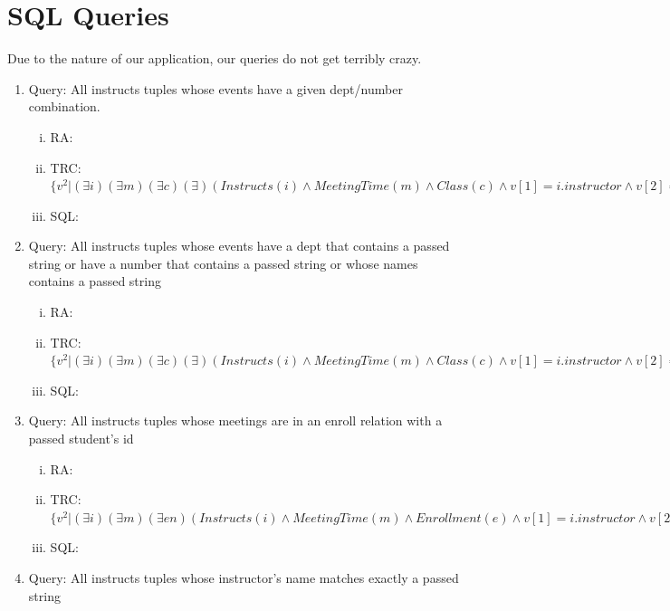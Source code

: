 \documentclass[pdftex,12pt,letter]{article}
\begin{document}
\section{SQL Queries}
Due to the nature of our application, our queries do not get terribly crazy.
\begin{enumerate}[1.]
\item Query: All instructs tuples whose events have a given dept/number combination.
\begin{enumerate}[i.]
\item RA: 
\item TRC: $\{v^2\vert(\exists i)(\exists m)(\exists c)(\exists)(Instructs(i) \wedge MeetingTime(m) \wedge Class(c) \wedge v[1]=i.instructor \wedge v[2]=i.meeting \wedge i.meeting=m.id \wedge m.meeting\_class = c.pk \wedge c.dept=input\_dept \wedge c.class\_number = input\_number)\}$
\item SQL:
\end{enumerate}
\item Query: All instructs tuples whose events have a dept that contains a passed string
or have a number that contains a passed string or whose names contains a
passed string
\begin{enumerate}[i.]
\item RA:
\item TRC:$\{v^2\vert(\exists i)(\exists m)(\exists c)(\exists)(Instructs(i) \wedge MeetingTime(m) \wedge Class(c) \wedge v[1]=i.instructor \wedge v[2]=i.meeting \wedge i.meeting=m.id \wedge m.meeting\_class = c.pk \wedge (Contains(c.dept, input\_dept) \vee Contains(c.number, input\_number) \vee Contains(c.classname, input\_name)))\}$
\item SQL:
\end{enumerate}
\item Query: All instructs tuples whose meetings are in an enroll relation with a
passed student's id
\begin{enumerate}[i.]
\item RA:
\item TRC: $\{v^2\vert(\exists i)(\exists m)(\exists en)(Instructs(i) \wedge MeetingTime(m) \wedge Enrollment(e) \wedge v[1]=i.instructor \wedge v[2]=i.meeting \wedge i.meeting=m.id \wedge en.student=input\_id \wedge en.event=m.id)\}$
\item SQL:
\end{enumerate}
\item Query: All instructs tuples whose instructor's name matches exactly a passed string
\begin{enumerate}[i.]

\end{enumerate}
\end{enumerate}
\end{document}
